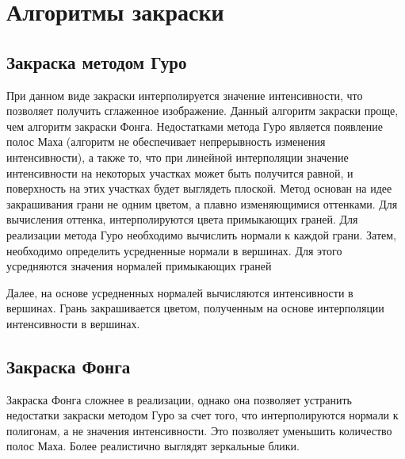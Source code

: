 \section{Алгоритмы закраски}

\subsection{Закраска методом Гуро}

При данном виде закраски интерполируется значение интенсивности, что позволяет получить сглаженное изображение. Данный алгоритм закраски проще, чем алгоритм закраски Фонга. Недостатками метода Гуро является появление полос Маха (алгоритм не обеспечивает непрерывность изменения интенсивности), а также то, что при линейной интерполяции значение интенсивности на некоторых участках может быть получится равной, и поверхность на этих участках будет выглядеть плоской.
Метод основан на идее закрашивания грани не одним цветом, а плавно изменяющимися оттенками. Для вычисления оттенка, интерполируются цвета примыкающих граней.
Для реализации метода Гуро необходимо вычислить нормали к каждой грани. Затем, необходимо определить усредненные нормали в вершинах. Для этого усредняются значения нормалей примыкающих граней



\begin{figure}[ht!]
\end{figure}

Далее, на основе усредненных нормалей вычисляются интенсивности в вершинах. Грань закрашивается цветом, полученным на основе интерполяции интенсивности в вершинах.


\begin{figure}[ht!]
\end{figure}




\subsection{Закраска Фонга}



Закраска Фонга сложнее в реализации, однако она позволяет устранить недостатки закраски методом Гуро за счет того, что интерполируются нормали к полигонам, а не значения интенсивности. Это позволяет уменьшить количество полос Маха. Более реалистично выглядят зеркальные блики.


